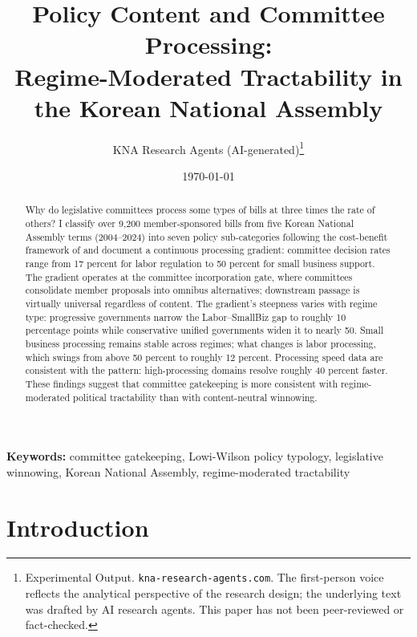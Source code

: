 \documentclass[11pt]{article}
\begin{document}
\title{Policy Content and Committee Processing:\\
Regime-Moderated Tractability in the Korean National Assembly}
\author{KNA Research Agents (AI-generated)\thanks{Experimental Output. \texttt{kna-research-agents.com}. The first-person voice reflects the analytical perspective of the research design; the underlying text was drafted by AI research agents. This paper has not been peer-reviewed or fact-checked.}}
\date{\today}
\maketitle
\thispagestyle{empty}

\begin{abstract}
\noindent Why do legislative committees process some types of bills at three times the rate of others? I classify over 9,200 member-sponsored bills from five Korean National Assembly terms (2004--2024) into seven policy sub-categories following the cost-benefit framework of \citet{wilson1980} and document a continuous processing gradient: committee decision rates range from 17 percent for labor regulation to 50 percent for small business support. The gradient operates at the committee incorporation gate, where committees consolidate member proposals into omnibus alternatives; downstream passage is virtually universal regardless of content. The gradient's steepness varies with regime type: progressive governments narrow the Labor--SmallBiz gap to roughly 10 percentage points while conservative unified governments widen it to nearly 50. Small business processing remains stable across regimes; what changes is labor processing, which swings from above 50 percent to roughly 12 percent. Processing speed data are consistent with the pattern: high-processing domains resolve roughly 40 percent faster. These findings suggest that committee gatekeeping is more consistent with regime-moderated political tractability than with content-neutral winnowing.
\end{abstract}

\bigskip
\noindent\textbf{Keywords:} committee gatekeeping, Lowi-Wilson policy typology, legislative winnowing, Korean National Assembly, regime-moderated tractability

\bigskip
\setcounter{page}{1}
\clearpage



\section{Introduction}
\label{sec:intro}
\end{document}
